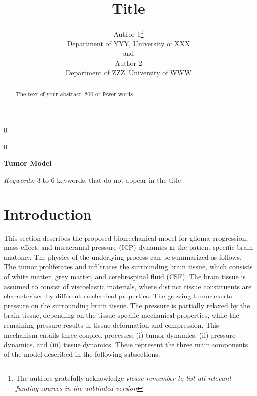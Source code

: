 \documentclass[12pt]{article}
\newcommand{\blind}{0}
\begin{document}
%

\def\spacingset#1{\renewcommand{\baselinestretch}%
{#1}\small\normalsize} \spacingset{1}



\blind
{
  \title{\bf Title}
  \author{Author 1\thanks{
    The authors gratefully acknowledge \textit{please remember to list all relevant funding sources in the unblinded version}}\hspace{.2cm}\\
    Department of YYY, University of XXX\\
    and \\
    Author 2 \\
    Department of ZZZ, University of WWW}
  \maketitle
} \fi

\blind
{
  \bigskip
  \bigskip
  \bigskip
  \begin{center}
    {\LARGE\bf Tumor Model}
\end{center}
  \medskip
} \fi

\bigskip
\begin{abstract}
The text of your abstract. 200 or fewer words.
\end{abstract}

\noindent%
{\it Keywords:}  3 to 6 keywords, that do not appear in the title
\vfill

\newpage
\spacingset{1.9} %


\section{Introduction}
\label{sec:intro}

This section describes the proposed biomechanical model for glioma progression, mass effect, and intracranial pressure (ICP) dynamics in the patient-specific brain anatomy. The physics of the underlying process can be summarized as follows. The tumor proliferates and infiltrates the surrounding brain tissue, which consists of white matter, grey matter, and cerebrospinal fluid (CSF). The brain tissue is assumed to consist of viscoelastic materials, where distinct tissue constituents are characterized by different mechanical properties. The growing tumor exerts pressure on the surrounding brain tissue. The pressure is partially relaxed by the brain tissue, depending on the tissue-specific mechanical properties, while the remaining pressure results in tissue deformation and compression. This mechanism entails three coupled processes: (i) tumor dynamics, (ii) pressure dynamics, and (iii) tissue dynamics. These represent the three main components of the model described in the following subsections.
\end{document}
